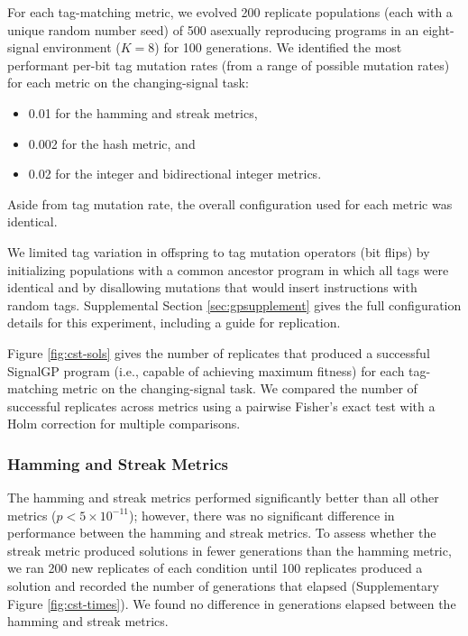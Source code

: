For each tag-matching metric, we evolved 200 replicate populations (each with a unique random number seed) of 500 asexually reproducing programs in an eight-signal environment ($K=8$) for 100 generations.
We identified the most performant per-bit tag mutation rates (from a range of possible mutation rates) for each metric on the changing-signal task:
\begin{itemize}
    \item 0.01 for the hamming and streak metrics,
    \item 0.002 for the hash metric, and
    \item 0.02 for the integer and bidirectional integer metrics.
\end{itemize}
Aside from tag mutation rate, the overall configuration used for each metric was identical.

We limited tag variation in offspring to tag mutation operators (bit flips) by initializing populations with a common ancestor program in which all tags were identical and by disallowing mutations that would insert instructions with random tags.
Supplemental Section \ref{sec:gpsupplement} gives the full configuration details for this experiment, including a guide for replication.

% 

Figure \ref{fig:cst-sols} gives the number of replicates that produced a successful SignalGP program (i.e., capable of achieving maximum fitness) for each tag-matching metric on the changing-signal task.
We compared the number of successful replicates across metrics using a pairwise Fisher's exact test with a Holm correction for multiple comparisons.

\subsubsection{Hamming and Streak Metrics}

The hamming and streak metrics performed significantly better than all other metrics ($p < 5\times10^{-11}$); however, there was no significant difference in performance between the hamming and streak metrics.
To assess whether the streak metric produced solutions in fewer generations than the hamming metric, we ran 200 new replicates of each condition until 100 replicates produced a solution and recorded the number of generations that elapsed (Supplementary Figure \ref{fig:cst-times}).
We found no difference in generations elapsed between the hamming and streak metrics.

